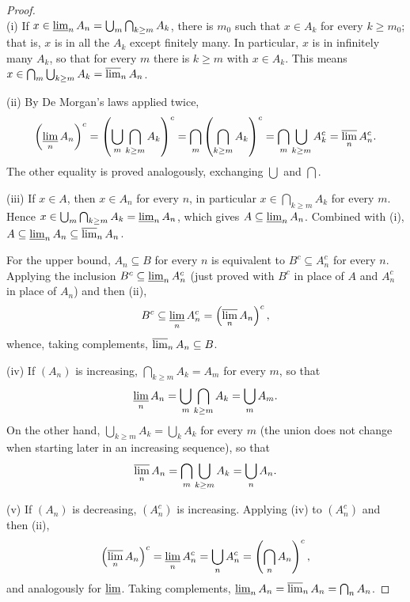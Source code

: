 \documentclass[11pt, a4paper]{article}
\begin{document}
\begin{proof}\leavevmode\\
(i) If $x \in \varliminf_n A_n = \bigcup_m \bigcap_{k \ge m} A_k$, there is $m_0$ such that $x \in
A_k$ for every $k \ge m_0$; that is, $x$ is in all the $A_k$ except finitely many. In particular,
$x$ is in infinitely many $A_k$, so that for every $m$ there is $k \ge m$ with $x \in A_k$. This
means $x \in \bigcap_m \bigcup_{k \ge m} A_k = \varlimsup_n A_n$.

(ii) By De Morgan's laws applied twice,
$$ \left(\varliminf_n A_n\right)^c = \left(\bigcup_m \bigcap_{k \ge m} A_k\right)^c =
\bigcap_m \left(\bigcap_{k \ge m} A_k\right)^c = \bigcap_m \bigcup_{k \ge m} A_k^c =
\varlimsup_n A_n^c. $$
The other equality is proved analogously, exchanging $\bigcup$ and $\bigcap$.

(iii) If $x \in A$, then $x \in A_n$ for every $n$, in particular $x \in \bigcap_{k \ge m}
A_k$ for every $m$. Hence $x \in \bigcup_m \bigcap_{k \ge m} A_k = \varliminf_n A_n$, which
gives $A \subseteq \varliminf_n A_n$. Combined with (i), $A \subseteq \varliminf_n A_n \subseteq
\varlimsup_n A_n$.

For the upper bound, $A_n \subseteq B$ for every $n$ is equivalent to $B^c \subseteq A_n^c$ for every
$n$. Applying the inclusion $B^c \subseteq \varliminf_n A_n^c$ (just proved with $B^c$ in
place of $A$ and $A_n^c$ in place of $A_n$) and then (ii),
$$ B^c \subseteq \varliminf_n A_n^c = \left(\varlimsup_n A_n\right)^c, $$
whence, taking complements, $\varlimsup_n A_n \subseteq B$.

(iv) If $(A_n)$ is increasing, $\bigcap_{k \ge m} A_k = A_m$ for every $m$, so that
$$ \varliminf_n A_n = \bigcup_m \bigcap_{k \ge m} A_k = \bigcup_m A_m. $$
On the other hand, $\bigcup_{k \ge m} A_k = \bigcup_k A_k$ for every $m$ (the union does not change when
starting later in an increasing sequence), so that
$$ \varlimsup_n A_n = \bigcap_m \bigcup_{k \ge m} A_k = \bigcup_n A_n. $$

(v) If $(A_n)$ is decreasing, $(A_n^c)$ is increasing. Applying (iv) to $(A_n^c)$ and then (ii),
$$ \left(\varlimsup_n A_n\right)^c = \varliminf_n A_n^c = \bigcup_n A_n^c =
\left(\bigcap_n A_n\right)^c, $$
and analogously for $\varliminf$. Taking complements, $\varliminf_n A_n = \varlimsup_n A_n
= \bigcap_n A_n$.
\end{proof}
\end{document}

